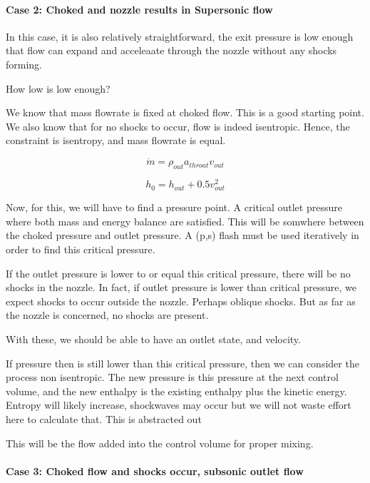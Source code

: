 \documentclass[masters]{ucbthesis}
\renewcommand{\_}{\kern-1.5pt\textunderscore\kern-1.5pt}
\begin{document}
\paragraph{Case 2: Choked and nozzle results in Supersonic flow}

In this case, it is also relatively straightforward, the exit pressure 
is low enough that flow can expand and acceleaate through the nozzle 
without any shocks forming.

How low is low enough?

We know that mass flowrate is fixed at choked flow. This is a good 
starting point. We also know that for no shocks to occur, flow is indeed 
isentropic. Hence, the constraint is isentropy, and mass flowrate is equal.

\begin{equation*}
	\dot{m} = \rho_{out} a_{throat} v_{out}
\end{equation*}

\begin{equation*}
	h_0 = h_{out} + 0.5 v^2_{out}
\end{equation*}

Now, for this, we will have to find a pressure point. A critical outlet 
pressure where both mass and energy balance are satisfied. This will be 
somwhere between the choked pressure and outlet pressure. A (p,s) flash 
must be used iteratively in order to find this critical pressure.

If the outlet pressure is lower to or equal this critical pressure, there 
will be no shocks in the nozzle. In fact, if outlet pressure is lower 
than critical pressure, we expect shocks to occur outside the nozzle.
Perhaps oblique shocks. But as far as the nozzle is concerned, no shocks 
are present.

With these, we should be able to have an outlet state, and velocity.

If pressure then is still lower than this critical pressure, then we 
can consider the process non isentropic. The new pressure is this 
pressure at the next control volume, and the new enthalpy is the 
existing enthalpy plus the kinetic energy. Entropy will likely increase,
shockwaves may occur but we will not waste effort here to calculate that.
This is abstracted out

This will be the flow added into the control volume for proper mixing.


\paragraph{Case 3: Choked flow and shocks occur, subsonic outlet flow}
\end{document}
